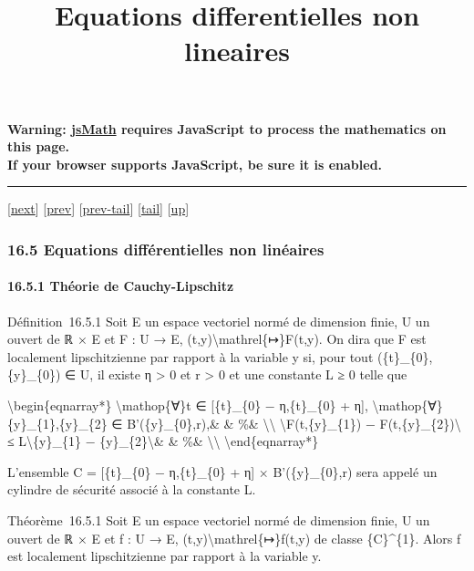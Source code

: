 \documentclass[]{article}
\title{Equations differentielles non lineaires}
\author{}
\date{}
\begin{document}
\maketitle

\textbf{Warning: \href{http://www.math.union.edu/locate/jsMath}{jsMath}
requires JavaScript to process the mathematics on this page.\\ If your
browser supports JavaScript, be sure it is enabled.}

\begin{center}\rule{3in}{0.4pt}\end{center}

{[}\href{coursse91.html}{next}{]} {[}\href{coursse89.html}{prev}{]}
{[}\href{coursse89.html\#tailcoursse89.html}{prev-tail}{]}
{[}\hyperref[tailcoursse90.html]{tail}{]}
{[}\href{coursch17.html\#coursse90.html}{up}{]}

\subsubsection{16.5 Equations différentielles non linéaires}

\paragraph{16.5.1 Théorie de Cauchy-Lipschitz}

Définition~16.5.1 Soit E un espace vectoriel normé de dimension finie, U
un ouvert de ℝ × E et F : U → E,
(t,y)\textbackslash{}mathrel\{↦\}F(t,y). On dira que F est localement
lipschitzienne par rapport à la variable y si, pour tout
(\{t\}\_\{0\},\{y\}\_\{0\}) ∈ U, il existe η \textgreater{} 0 et r
\textgreater{} 0 et une constante L ≥ 0 telle que

\textbackslash{}begin\{eqnarray*\} \textbackslash{}mathop\{∀\}t ∈
{[}\{t\}\_\{0\} − η,\{t\}\_\{0\} + η{]},
\textbackslash{}mathop\{∀\}\{y\}\_\{1\},\{y\}\_\{2\} ∈
B'(\{y\}\_\{0\},r),\& \& \%\& \textbackslash{}\textbackslash{}
\textbackslash{}\textbar{}F(t,\{y\}\_\{1\}) −
F(t,\{y\}\_\{2\})\textbackslash{}\textbar{} ≤
L\textbackslash{}\textbar{}\{y\}\_\{1\} −
\{y\}\_\{2\}\textbackslash{}\textbar{}\& \& \%\&
\textbackslash{}\textbackslash{} \textbackslash{}end\{eqnarray*\}

L'ensemble C = {[}\{t\}\_\{0\} − η,\{t\}\_\{0\} + η{]} ×
B'(\{y\}\_\{0\},r) sera appelé un cylindre de sécurité associé à la
constante L.

Théorème~16.5.1 Soit E un espace vectoriel normé de dimension finie, U
un ouvert de ℝ × E et f : U → E, (t,y)\textbackslash{}mathrel\{↦\}f(t,y)
de classe \{C\}\^{}\{1\}. Alors f est localement lipschitzienne par
rapport à la variable y.
\end{document}
